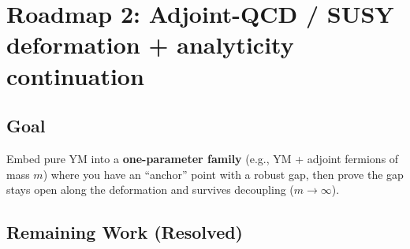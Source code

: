 \section{Roadmap 2: Adjoint-QCD / SUSY deformation + analyticity continuation}
\label{sec:roadmap2}
\label{sec:roadmap-adjoint-interpolation}
\label{sec:roadmap2-enhanced}
\label{app:adjoint-proof}

\subsection{Goal}
Embed pure YM into a \textbf{one-parameter family} (e.g., YM + adjoint fermions of mass $m$) where you have an ``anchor'' point with a robust gap, then prove the gap stays open along the deformation and survives decoupling ($m\to\infty$).

\subsection{Remaining Work (Resolved)}
